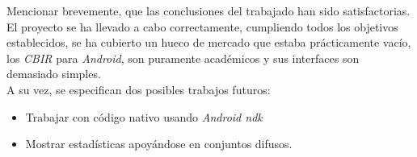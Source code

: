 Mencionar brevemente, que las conclusiones del trabajado han sido satisfactorias. El proyecto se ha llevado a cabo correctamente, cumpliendo todos los objetivos establecidos, se ha cubierto un hueco de mercado que estaba prácticamente vacío, los \textit{CBIR} para \textit{Android}, son puramente académicos y sus interfaces son demasiado simples.\\

A su vez, se especifican dos posibles trabajos futuros:

\begin{itemize}

\item Trabajar con código nativo usando \textit{Android ndk}

\item Mostrar estadísticas apoyándose en conjuntos difusos.

\end{itemize}



















